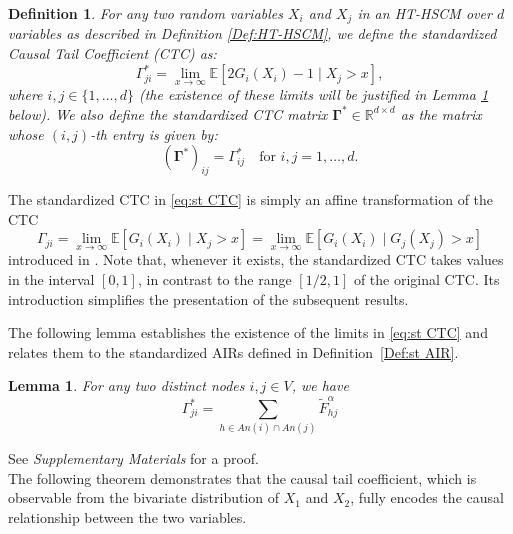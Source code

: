 \documentclass[10pt]{article}
\newtheorem{lemma}[theorem]{Lemma}
\newtheorem{definition}[theorem]{Definition}
\begin{document}
 
\begin{definition}\label{Def:CTC}
    For any two random variables $X_i$ and $X_j$ in an HT-HSCM over $d$ variables as described in Definition \ref{Def:HT-HSCM}, we define the standardized Causal Tail Coefficient (CTC)  as:
    \begin{equation}\label{eq:st CTC}
        \Gamma^*_{ji} = \lim_{x \to \infty} \mathbb{E}[2G_i(X_i) - 1 \mid X_j > x],
    \end{equation}
    where $i, j \in \{1, \dots, d\}$ (the existence of these limits will be justified in Lemma \ref{Lem:CTC expr} below).   We also define  the standardized CTC  matrix $\boldsymbol{\Gamma}^* \in \mathbb{R}^{d \times d}$ as the matrix whose $(i,j)$-th entry is given by:
    \[
        (\boldsymbol{\Gamma}^*)_{ij} = \Gamma^*_{ij} \quad \text{for } i,j = 1, \dots, d.
    \]
\end{definition}

The standardized CTC  in \eqref{eq:st CTC} is simply an affine transformation of the CTC 
\[
\Gamma_{ji}= \lim_{x \to \infty} \mathbb{E}\!\left[ G_i(X_i) \mid X_j > x \right]= \lim_{x \to \infty} \mathbb{E}\!\left[ G_i(X_i) \mid G_j (X_j) > x \right]
\]
introduced in \cite{gnecco2021causal}. Note that, whenever it exists, the standardized CTC takes values in the interval $[0,1]$, in contrast to the range $[1/2,1]$ of the original CTC. 
Its introduction simplifies the presentation of the subsequent results.


 

The following lemma establishes the existence of the limits in \eqref{eq:st CTC} and relates them to the standardized AIRs defined in Definition~\ref{Def:st AIR}.

 

\begin{lemma} \label{Lem:CTC expr}
    For any two distinct nodes $i, j \in V$, we have
    \begin{equation}
        \Gamma^*_{ji} = \sum_{h \in {An}(i) \cap {An}(j)} \widetilde{F}_{hj}^\alpha
        \end{equation}
\end{lemma}
See \textit{Supplementary Materials} for a proof.\\
The following theorem demonstrates that the causal tail coefficient,  which is observable from the bivariate distribution of $X_1$ and $X_2$, fully encodes  the causal relationship between the two variables.
\end{document}
